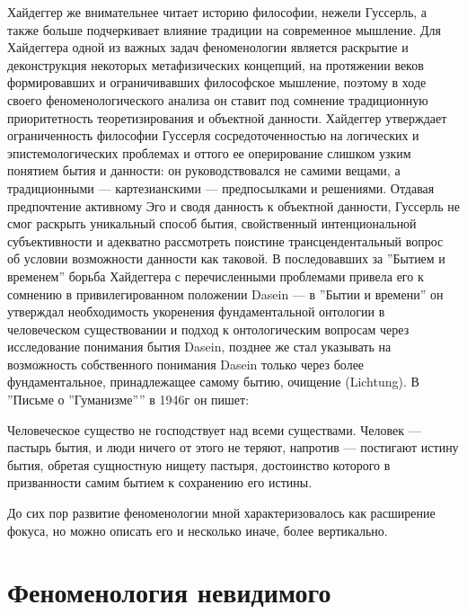 \documentclass[11pt]{book}
\begin{document}
Хайдеггер же внимательнее читает историю философии, нежели Гуссерль, а также больше подчеркивает влияние традиции на современное мышление. Для Хайдеггера одной из важных задач феноменологии является раскрытие и деконструкция некоторых метафизических концепций, на протяжении веков формировавших и ограничивавших философское мышление, поэтому в ходе своего феноменологического анализа он ставит под сомнение традиционную приоритетность теоретизирования и объектной данности. Хайдеггер утверждает ограниченность философии Гуссерля сосредоточенностью на логических и эпистемологических проблемах и оттого ее оперирование слишком узким понятием бытия и данности: он руководствовался не самими вещами, а традиционными --- картезианскими --- предпосылками и решениями. Отдавая предпочтение активному Эго и сводя данность к объектной данности, Гуссерль не смог раскрыть уникальный способ бытия, свойственный интенциональной субъективности и адекватно рассмотреть поистине трансцендентальный вопрос об условии возможности данности как таковой. В последовавших за ''Бытием и временем'' борьба Хайдеггера с перечисленными проблемами привела его к сомнению в привилегированном положении Dasein --- в ''Бытии и времени'' он утверждал необходимость укоренения фундаментальной онтологии в человеческом существовании и подход к онтологическим вопросам через исследование понимания бытия Dasein, позднее же стал указывать на возможность собственного понимания Dasein только через более фундаментальное, принадлежащее самому бытию, очищение (Lichtung). В ''Письме о ''Гуманизме'''' в 1946г он пишет:

\smallskip
{}\relax
{}\relax

Человеческое существо не господствует над всеми существами. Человек --- пастырь бытия, и люди ничего от этого не теряют, напротив --- постигают истину бытия, обретая сущностную нищету пастыря, достоинство которого в призванности самим бытием к сохранению его истины.

\relax
{}\relax
\smallskip

До сих пор развитие феноменологии мной характеризовалось как расширение фокуса, но можно описать его и несколько иначе, более вертикально.

\section{Феноменология невидимого}
\end{document}
